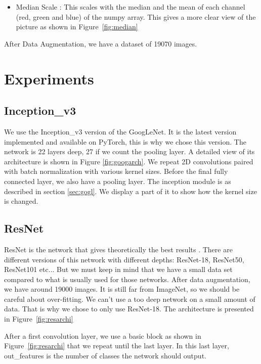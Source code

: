 \begin{itemize}
    \item Median Scale : This scales with the median and the mean of each channel (red, green and blue) of the numpy array. This gives a more clear view of the picture as shown in Figure~\ref{fig:median}  
 \end{itemize}

After Data Augmentation, we have a dataset of 19070 images. 


\section{Experiments}
\subsection{Inception\_v3}
We use the Inception\_v3 version of the GoogLeNet. It is the latest version implemented and available on PyTorch, this is why we chose this version. The network is 22 layers deep, 27 if we count the pooling layer. A detailed view of its architecture is shown in Figure \ref{fig:googarch}.
We repeat 2D convolutions paired with batch normalization with various kernel sizes. Before the final fully connected layer, we also have a pooling layer. The inception module is as described in section \ref{sec:gogl}. We display a part of it to show how the kernel size is changed.  
\subsection{ResNet}
ResNet is the network that gives theoretically the best results \cite{resnetpaper}. There are different versions of this network with different depths: ResNet-18, ResNet50, ResNet101 etc... But we must keep in mind that we have a small data set compared to what is usually used for those networks. After data augmentation, we have around 19000 images. It is still far from ImageNet, so we should be careful about over-fitting. We can't use a too deep network on a small amount of data. That is why we chose to only use ResNet-18. The architecture is presented in Figure~\ref{fig:resarchi}

After a first convolution layer, we use a basic block as shown in Figure~\ref{fig:resarchi} that we repeat until the last layer. In this last layer, out\_features is the number of classes the network should output. 
